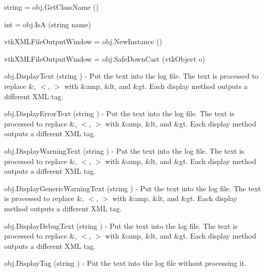 \begin{DoxyItemize}
\item {\ttfamily string = obj.\-Get\-Class\-Name ()}  
\item {\ttfamily int = obj.\-Is\-A (string name)}  
\item {\ttfamily vtk\-X\-M\-L\-File\-Output\-Window = obj.\-New\-Instance ()}  
\item {\ttfamily vtk\-X\-M\-L\-File\-Output\-Window = obj.\-Safe\-Down\-Cast (vtk\-Object o)}  
\item {\ttfamily obj.\-Display\-Text (string )} -\/ Put the text into the log file. The text is processed to replace \&, $<$, $>$ with \&amp, \&lt, and \&gt. Each display method outputs a different X\-M\-L tag.  
\item {\ttfamily obj.\-Display\-Error\-Text (string )} -\/ Put the text into the log file. The text is processed to replace \&, $<$, $>$ with \&amp, \&lt, and \&gt. Each display method outputs a different X\-M\-L tag.  
\item {\ttfamily obj.\-Display\-Warning\-Text (string )} -\/ Put the text into the log file. The text is processed to replace \&, $<$, $>$ with \&amp, \&lt, and \&gt. Each display method outputs a different X\-M\-L tag.  
\item {\ttfamily obj.\-Display\-Generic\-Warning\-Text (string )} -\/ Put the text into the log file. The text is processed to replace \&, $<$, $>$ with \&amp, \&lt, and \&gt. Each display method outputs a different X\-M\-L tag.  
\item {\ttfamily obj.\-Display\-Debug\-Text (string )} -\/ Put the text into the log file. The text is processed to replace \&, $<$, $>$ with \&amp, \&lt, and \&gt. Each display method outputs a different X\-M\-L tag.  
\item {\ttfamily obj.\-Display\-Tag (string )} -\/ Put the text into the log file without processing it.  
\end{DoxyItemize}